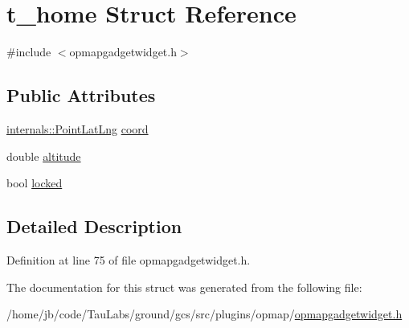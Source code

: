 \hypertarget{structt__home}{\section{t\-\_\-home \-Struct \-Reference}
\label{structt__home}
}


{\ttfamily \#include $<$opmapgadgetwidget.\-h$>$}

\subsection*{\-Public \-Attributes}
\begin{DoxyCompactItemize}
\item 
\hyperlink{structinternals_1_1_point_lat_lng}{internals\-::\-Point\-Lat\-Lng} \hyperlink{group___o_p_map_plugin_ga6324b0912396582281b54bc6d5a6f38a}{coord}
\item 
double \hyperlink{group___o_p_map_plugin_ga14ce78cb516fe7a0e7f20e423e92d538}{altitude}
\item 
bool \hyperlink{group___o_p_map_plugin_ga4cc9a1ca8d219f1aa6d823fab6080f02}{locked}
\end{DoxyCompactItemize}


\subsection{\-Detailed \-Description}


\-Definition at line 75 of file opmapgadgetwidget.\-h.



\-The documentation for this struct was generated from the following file\-:\begin{DoxyCompactItemize}
\item 
/home/jb/code/\-Tau\-Labs/ground/gcs/src/plugins/opmap/\hyperlink{opmapgadgetwidget_8h}{opmapgadgetwidget.\-h}\end{DoxyCompactItemize}
